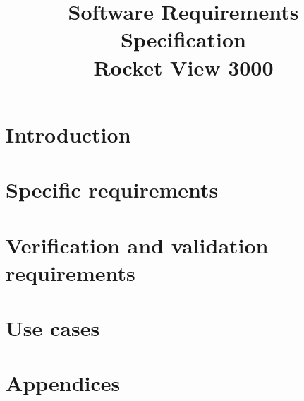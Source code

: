\documentclass[10pt, letterpaper]{article}
\title{Software Requirements Specification\\
    {\normalsize Rocket View 3000 \vers}
    }
\author{}
\begin{document}
  \maketitle
  
  \tableofcontents
  \newpage

  \section{Introduction}
    

  

  \section{Specific requirements}
    

    

    

  \section{Verification and validation requirements}
    

  \section{Use cases}

    

  \section{Appendices}

    
\end{document}
